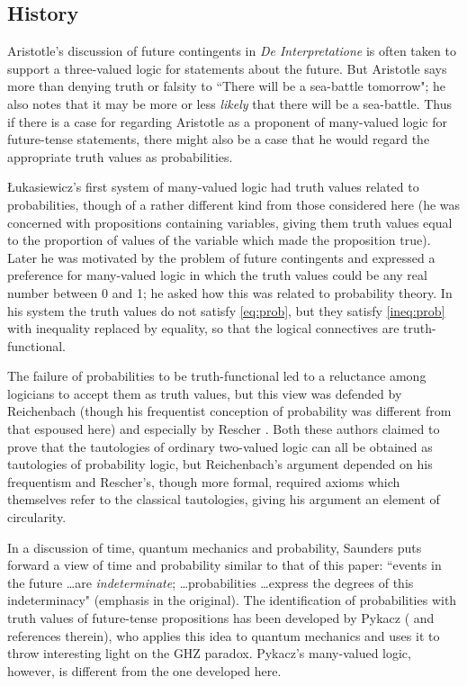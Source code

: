 \documentclass[12pt,a4paper,reqno]{article}
\renewcommand{\(}{\left(}
\renewcommand{\)}{\right)}
\newcommand{\<}{\langle}
\renewcommand{\>}{\rangle}
\theoremstyle{plain} %
\begin{document}
\subsection{History}
\label{subsec:history}

Aristotle's discussion of future contingents in \emph{De Interpretatione} is often taken to support a three-valued logic for statements about the future. But Aristotle says more than denying truth or falsity to ``There will be a sea-battle tomorrow"; he also notes that it may be more or less \emph{likely} that there will be a sea-battle. Thus if there is a case for regarding Aristotle as a proponent of many-valued logic for future-tense statements, there might also be a case that he would regard the appropriate truth values as probabilities.

\L ukasiewicz's first system of many-valued logic \cite{Luk:prob} had truth values related to probabilities, though of a rather different kind from those considered here (he was concerned with propositions containing variables, giving them truth values equal to the proportion of values of the variable which made the proposition true). Later \cite{Luk:indeterminism} he was motivated by the problem of future contingents and expressed a preference for many-valued logic in which the truth values could be any real number between 0 and 1; he asked how this was related to probability theory. In his system the truth values do not satisfy \eqref{eq:prob}, but they satisfy \eqref{ineq:prob} with inequality replaced by equality, so that the logical connectives are truth-functional. 

The failure of probabilities to be truth-functional led to a reluctance among logicians to accept them as truth values, but this view was defended by Reichenbach \cite{Reichenbach:probty} (though his frequentist conception of probability was different from that espoused here) and especially by Rescher \cite {Rescher:manyval}. Both these authors claimed to prove that the tautologies of ordinary two-valued logic can all be obtained as tautologies of probability logic, but Reichenbach's argument depended on his frequentism and Rescher's, though more formal, required axioms which themselves refer to the classical tautologies, giving his argument an element of circularity.

In a discussion of time, quantum mechanics and probability, Saunders \cite{Saunders:Synthese3} puts forward a view of time and probability similar to that of this paper: ``events in the future \ldots are \emph{indeterminate}; \ldots probabilities \ldots express the degrees of this indeterminacy" (emphasis in the original). The identification of probabilities with truth values of future-tense propositions has been developed  by Pykacz (\cite{Pykacz} and references therein), who applies this idea to quantum mechanics and uses it to throw interesting light on the GHZ paradox. Pykacz's many-valued logic, however, is different from the one developed here. 
\end{document}
